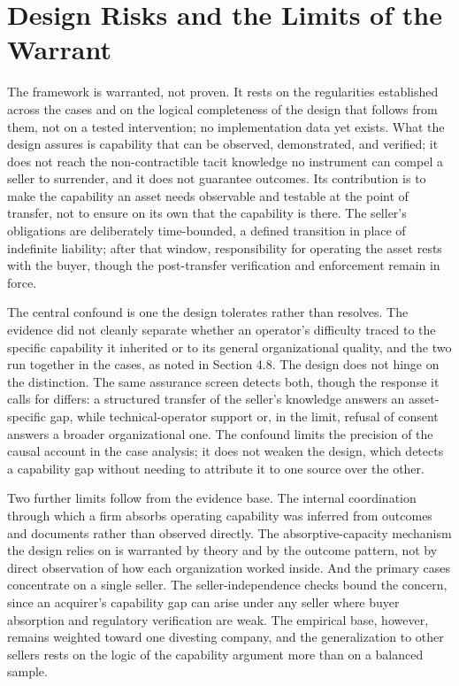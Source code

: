 \hypertarget{design-risks-and-the-limits-of-the-warrant}{%
\section{Design Risks and the Limits of the
Warrant}\label{design-risks-and-the-limits-of-the-warrant}}

The framework is warranted, not proven. It rests on the regularities
established across the cases and on the logical completeness of the
design that follows from them, not on a tested intervention; no
implementation data yet exists. What the design assures is capability
that can be observed, demonstrated, and verified; it does not reach the
non-contractible tacit knowledge no instrument can compel a seller to
surrender, and it does not guarantee outcomes. Its contribution is to
make the capability an asset needs observable and testable at the point
of transfer, not to ensure on its own that the capability is there. The
seller's obligations are deliberately time-bounded, a defined transition
in place of indefinite liability; after that window, responsibility for
operating the asset rests with the buyer, though the post-transfer
verification and enforcement remain in force.

The central confound is one the design tolerates rather than resolves.
The evidence did not cleanly separate whether an operator's difficulty
traced to the specific capability it inherited or to its general
organizational quality, and the two run together in the cases, as noted
in Section 4.8. The design does not hinge on the distinction. The same
assurance screen detects both, though the response it calls for differs:
a structured transfer of the seller's knowledge answers an
asset-specific gap, while technical-operator support or, in the limit,
refusal of consent answers a broader organizational one. The confound
limits the precision of the causal account in the case analysis; it does
not weaken the design, which detects a capability gap without needing to
attribute it to one source over the other.

Two further limits follow from the evidence base. The internal
coordination through which a firm absorbs operating capability was
inferred from outcomes and documents rather than observed directly. The
absorptive-capacity mechanism the design relies on is warranted by
theory and by the outcome pattern, not by direct observation of how each
organization worked inside. And the primary cases concentrate on a
single seller. The seller-independence checks bound the concern, since
an acquirer's capability gap can arise under any seller where buyer
absorption and regulatory verification are weak. The empirical base,
however, remains weighted toward one divesting company, and the
generalization to other sellers rests on the logic of the capability
argument more than on a balanced sample.

